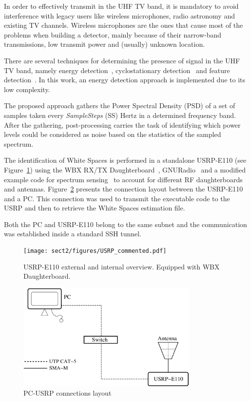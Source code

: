 In order to effectively transmit in the UHF TV band, it is mandatory to avoid interference with legacy users like wireless microphones, radio astronomy and existing TV channels. Wireless microphones are the ones that cause most of the problems when building a detector, mainly because of their narrow-band transmissions, low transmit power and (usually) unknown location. 

There are several techniques for determining the presence of signal in the UHF TV band, namely energy detection~\cite{cabric2006experimental}, cyclostationary detection~\cite{kim2007cyclostationary} and feature detection~\cite{cabric2006spectrum}. In this work, an energy detection approach is implemented due to its low complexity.

The proposed approach gathers the Power Spectral Density (PSD) of a set of samples taken every \emph{SampleSteps} (SS) Hertz in a determined frequency band. After the gathering, post-processing carries the task of identifying which power levels could be considered as noise based on the statistics of the sampled spectrum.

The identification of White Spaces is performed in a standalone USRP-E110 (see Figure~\ref{fig:usrp_combined}) using the WBX RX/TX Daughterboard~\cite{ettusWBX}, GNURadio~\cite{GNURadio} and a modified example code for spectrum sensing~\cite{sanabriaCodeUSRP} to account for different RF daughterboards and antennas. Figure~\ref{fig:connections} presents the connection layout between the USRP-E110 and a PC. This connection was used to transmit the executable code to the USRP and then to retrieve the White Spaces estimation file.

Both the PC and USRP-E110 belong to the same subnet and the communication was established inside a standard SSH tunnel.

\begin{figure}[htbp]
  \centering
  \texttt{[image: sect2/figures/USRP\_commented.pdf]}
  \caption{USRP-E110 external and internal overview. Equipped with WBX Daughterboard.}
  \label{fig:usrp_combined}
\end{figure}


\begin{figure}[htbp]
  \centering
  \includegraphics[width = 9cm]{sect2/figures/connections.pdf}
  \caption{PC-USRP connections layout}
  \label{fig:connections}
\end{figure}